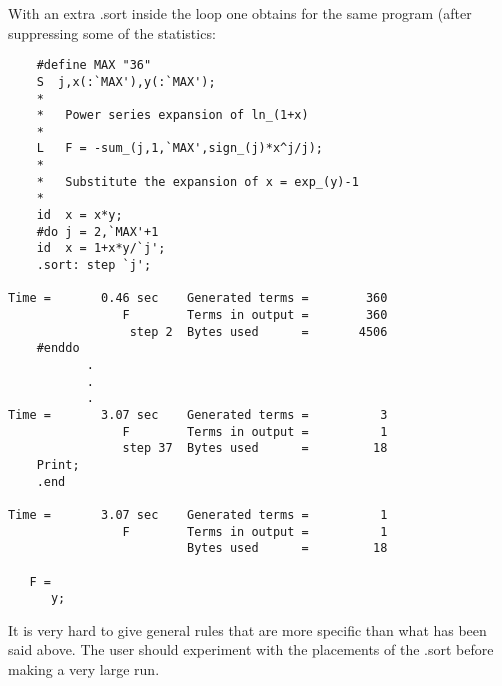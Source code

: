 With an extra .sort inside the loop one obtains for the same program (after 
suppressing some of the statistics:
\begin{verbatim}
    #define MAX "36"
    S  j,x(:`MAX'),y(:`MAX');
    *
    *	Power series expansion of ln_(1+x)
    *
    L	F = -sum_(j,1,`MAX',sign_(j)*x^j/j);
    *
    *	Substitute the expansion of x = exp_(y)-1
    *
    id	x = x*y;
    #do j = 2,`MAX'+1
    id	x = 1+x*y/`j';
    .sort: step `j';

Time =       0.46 sec    Generated terms =        360
                F        Terms in output =        360
                 step 2  Bytes used      =       4506
    #enddo
           .
           .
           .
Time =       3.07 sec    Generated terms =          3
                F        Terms in output =          1
                step 37  Bytes used      =         18
    Print;
    .end

Time =       3.07 sec    Generated terms =          1
                F        Terms in output =          1
                         Bytes used      =         18

   F =
      y;
\end{verbatim}
It is very hard to give general rules that are more specific than what has 
been said above. The user should experiment with the placements of the .sort 
before making a very large run. 


